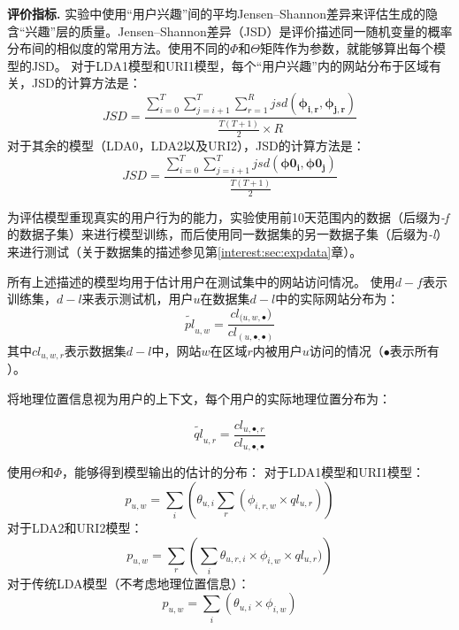 \textbf{评价指标.} 实验中使用``用户兴趣''间的平均Jensen–Shannon差异来评估生成的隐含``兴趣''层的质量。Jensen–Shannon差异（JSD）是评价描述同一随机变量的概率分布间的相似度的常用方法。使用不同的$\Phi$和$\Theta$矩阵作为参数，就能够算出每个模型的JSD。
对于LDA1模型和URI1模型，每个``用户兴趣''内的网站分布于区域有关，JSD的计算方法是：
\begin{equation}
	JSD = \frac{\sum^T_{i=0}\sum^T_{j=i+1}\sum^R_{r=1}{jsd(\mathbf{\phi_{i,r}}, \mathbf{\phi_{j,r}})}}{\frac{T(T+1)}{2} \times R}
\end{equation}
对于其余的模型（LDA0，LDA2以及URI2），JSD的计算方法是：
\begin{equation}
	JSD = \frac{\sum^T_{i=0}\sum^T_{j=i+1}{jsd(\mathbf{\phi0_{i}}, \mathbf{\phi0_{j}})}}{\frac{T(T+1)}{2}}
\end{equation}


为评估模型重现真实的用户行为的能力，实验使用前10天范围内的数据（后缀为\textit{-f}的数据子集）来进行模型训练，而后使用同一数据集的另一数据子集（后缀为\textit{-l}）来进行测试（关于数据集的描述参见第\ref{interest:sec:expdata}章）。

所有上述描述的模型均用于估计用户在测试集中的网站访问情况。
使用$d-f$表示训练集，$d-l$来表示测试机，用户$u$在数据集$d-l$中的实际网站分布为：
\begin{equation}
	\widetilde{pl}_{u,w} = \frac{cl_{(u,w,\bullet})}{cl_{(u,\bullet,\bullet)}}
\end{equation}
其中$cl_{u,w,r}$表示数据集$d-l$中，网站$w$在区域$r$内被用户$u$访问的情况（$\bullet$表示$所有$）。 

将地理位置信息视为用户的上下文，每个用户的实际地理位置分布为：

\begin{equation}
	\widetilde{ql}_{u,r} = \frac{cl_{u,\bullet,r}}{cl_{u,\bullet,\bullet}}
\end{equation}
 
使用$\Theta$和$\Phi$，能够得到模型输出的估计的分布：
对于LDA1模型和URI1模型：
\[
	p_{u,w} = \sum_i{\left(\theta_{u,i}  \sum_r{(\phi_{i,r,w} \times ql_{u,r})}\right)}
\]
对于LDA2和URI2模型：
\[
	p_{u,w} = \sum_r{\left(\sum_i{\theta_{u,r,i} \times \phi_{i,w}} \times ql_{u,r})\right)}
\]
对于传统LDA模型（不考虑地理位置信息）：
\[
	p_{u,w} = \sum_i{(\theta_{u,i} \times \phi_{i,w})}
\]


